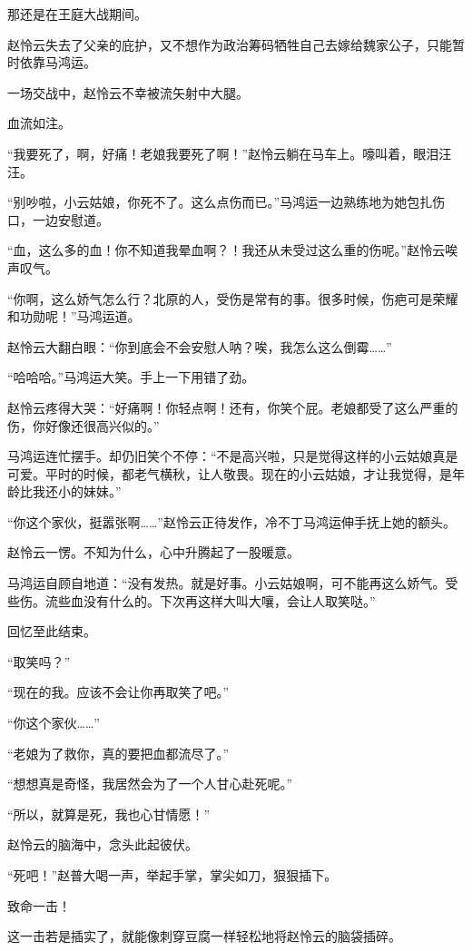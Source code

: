 \begin{this_body}
那还是在王庭大战期间。

赵怜云失去了父亲的庇护，又不想作为政治筹码牺牲自己去嫁给魏家公子，只能暂时依靠马鸿运。

一场交战中，赵怜云不幸被流矢射中大腿。

血流如注。

“我要死了，啊，好痛！老娘我要死了啊！”赵怜云躺在马车上。嚎叫着，眼泪汪汪。

“别吵啦，小云姑娘，你死不了。这么点伤而已。”马鸿运一边熟练地为她包扎伤口，一边安慰道。

“血，这么多的血！你不知道我晕血啊？！我还从未受过这么重的伤呢。”赵怜云唉声叹气。

“你啊，这么娇气怎么行？北原的人，受伤是常有的事。很多时候，伤疤可是荣耀和功勋呢！”马鸿运道。

赵怜云大翻白眼：“你到底会不会安慰人呐？唉，我怎么这么倒霉……”

“哈哈哈。”马鸿运大笑。手上一下用错了劲。

赵怜云疼得大哭：“好痛啊！你轻点啊！还有，你笑个屁。老娘都受了这么严重的伤，你好像还很高兴似的。”

马鸿运连忙摆手。却仍旧笑个不停：“不是高兴啦，只是觉得这样的小云姑娘真是可爱。平时的时候，都老气横秋，让人敬畏。现在的小云姑娘，才让我觉得，是年龄比我还小的妹妹。”

“你这个家伙，挺嚣张啊……”赵怜云正待发作，冷不丁马鸿运伸手抚上她的额头。

赵怜云一愣。不知为什么，心中升腾起了一股暖意。

马鸿运自顾自地道：“没有发热。就是好事。小云姑娘啊，可不能再这么娇气。受些伤。流些血没有什么的。下次再这样大叫大嚷，会让人取笑哒。”

回忆至此结束。

“取笑吗？”

“现在的我。应该不会让你再取笑了吧。”

“你这个家伙……”

“老娘为了救你，真的要把血都流尽了。”

“想想真是奇怪，我居然会为了一个人甘心赴死呢。”

“所以，就算是死，我也心甘情愿！”

赵怜云的脑海中，念头此起彼伏。

“死吧！”赵普大喝一声，举起手掌，掌尖如刀，狠狠插下。

致命一击！

这一击若是插实了，就能像刺穿豆腐一样轻松地将赵怜云的脑袋插碎。


\end{this_body}
